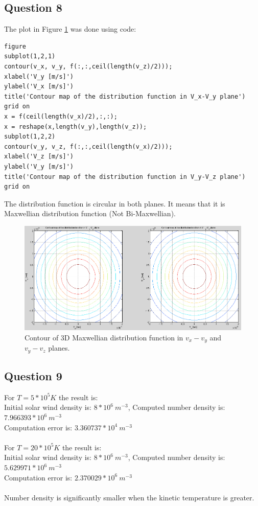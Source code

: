 \documentclass{article}
\begin{document}
\subsection{Question 8}
The plot in Figure \ref{fig:plot8} was done using code:
\begin{lstlisting}
figure
subplot(1,2,1)
contour(v_x, v_y, f(:,:,ceil(length(v_z)/2)));
xlabel('V_y [m/s]')
ylabel('V_x [m/s]')
title('Contour map of the distribution function in V_x-V_y plane')
grid on
x = f(ceil(length(v_x)/2),:,:);
x = reshape(x,length(v_y),length(v_z));
subplot(1,2,2)
contour(v_y, v_z, f(:,:,ceil(length(v_x)/2)));
xlabel('V_z [m/s]')
ylabel('V_y [m/s]')
title('Contour map of the distribution function in V_y-V_z plane')
grid on
\end{lstlisting}
The distribution function is circular in both planes. It means that it is Maxwellian distribution function (Not Bi-Maxwellian).
\begin{figure}[h!bt]
\centering
\includegraphics[width=\textwidth]{Figures/plot_8.png}
\caption{Contour of 3D Maxwellian distribution function in $v_x-v_y$ and $v_y-v_z$ planes.}
\label{fig:plot8}
\end{figure}

\subsection{Question 9}
For $T = 5*10^5 K$ the result is:\\
Initial solar wind density is: $8*10^6\:m^{-3}$, Computed number density is: $7.966393*10^6\:m^{-3}$\\
Computation error is: $3.360737*10^4\:m^{-3}$\\
\\
For $T = 20*10^5 K$ the result is:\\
Initial solar wind density is: $8*10^6\:m^{-3}$, Computed number density is: $5.629971*10^6\:m^{-3}$\\
Computation error is: $2.370029*10^6\:m^{-3}$\\
\\
Number density is significantly smaller when the kinetic temperature is greater.
\end{document}
